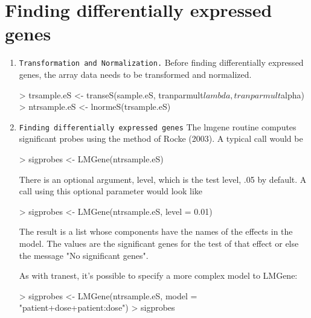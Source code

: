 \documentclass[11pt]{article}
\begin{document}
\section{Finding differentially expressed genes}

\begin{enumerate}
\item {\tt Transformation and Normalization.} Before finding differentially expressed genes,
the array data needs to be transformed and normalized. 

\begin{Schunk}
\begin{Sinput}
> trsample.eS <- transeS(sample.eS, tranparmult$lambda, tranparmult$alpha)
> ntrsample.eS <- lnormeS(trsample.eS)
\end{Sinput}
\end{Schunk}
   
\item {\tt Finding differentially expressed genes} 
The lmgene routine computes significant probes using the method of
   Rocke (2003). A typical call would be

\begin{Schunk}
\begin{Sinput}
> sigprobes <- LMGene(ntrsample.eS)
\end{Sinput}
\end{Schunk}
  There
   is an optional argument, level, which is the test level, .05 by
   default. A call using this optional parameter would look like

\begin{Schunk}
\begin{Sinput}
> sigprobes <- LMGene(ntrsample.eS, level = 0.01)
\end{Sinput}
\end{Schunk}
   The result is a list whose components have the names of the effects in the
   model. The values are the significant genes for the test of that effect or else the   
   message "No significant genes".

As with tranest, it's possible to specify a more complex model to LMGene:

\begin{Schunk}
\begin{Sinput}
> sigprobes <- LMGene(ntrsample.eS, model = "patient+dose+patient:dose")
> sigprobes
\end{Sinput}
\end{Schunk}
\end{enumerate}
\end{document}
